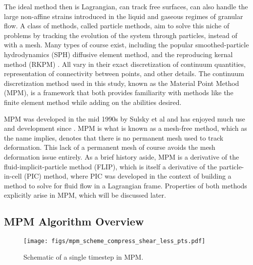 The ideal method then is Lagrangian, can track free surfaces, can also handle the large non-affine strains introduced in the liquid and gaseous regimes of granular flow. A class of methods, called particle methods, aim to solve this niche of problems by tracking the evolution of the system through particles, instead of with a mesh. Many types of course exist, including the popular smoothed-particle hydrodynamics (SPH) diffusive element method, and the reproducing kernal method (RKPM) \cite{Gingold:1977,Liu:1995}. All vary in their exact discretization of continuum quantities, representation of connectivity between points, and other details. The continuum discretization method used in this study, known as the Material Point Method (MPM), is a framework that both provides familiarity with methods like the finite element method while adding on the abilities desired.

MPM was developed in the mid 1990s by Sulsky et al and has enjoyed much use and development since \cite{Sulsky:1994}. MPM is what is known as a mesh-free method, which as the name implies, denotes that there is no permanent mesh used to track deformation. This lack of a permanent mesh of course avoids the mesh deformation issue entirely. As a brief history aside, MPM is a derivative of the fluid-implicit-particle method (FLIP), which is itself a derivative of the particle-in-cell (PIC) method, where PIC was developed in the context of building a method to solve for fluid flow in a Lagrangian frame. Properties of both methods explicitly arise in MPM, which will be discussed later.

\subsection{MPM Algorithm Overview}

\begin{figure}[htp] 
    \centering
    \texttt{[image: figs/mpm\_scheme\_compress\_shear\_less\_pts.pdf]}
    \caption{Schematic of a single timestep in MPM.}
    \label{MPM_diagram}
\end{figure}


